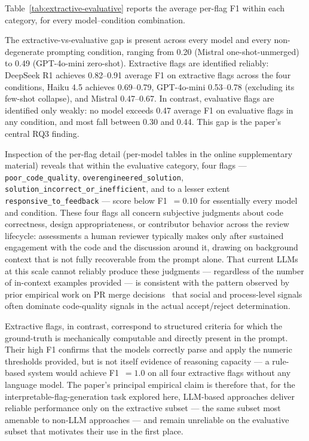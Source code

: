 Table~\ref{tab:extractive-evaluative} reports the average per-flag F1
within each category, for every model--condition combination.


The extractive-vs-evaluative gap is present across every model and
every non-degenerate prompting condition, ranging from 0.20 (Mistral
one-shot-unmerged) to 0.49 (GPT-4o-mini zero-shot).  Extractive flags
are identified reliably: DeepSeek R1 achieves 0.82--0.91 average F1
on extractive flags across the four conditions, Haiku 4.5 achieves
0.69--0.79, GPT-4o-mini 0.53--0.78 (excluding its few-shot collapse),
and Mistral 0.47--0.67.  In contrast, evaluative flags are identified
only weakly: no model exceeds 0.47 average F1 on evaluative flags in
any condition, and most fall between 0.30 and 0.44.  This gap is the
paper's central RQ3 finding.

Inspection of the per-flag detail (per-model tables in the online
supplementary material) reveals that within the evaluative category,
four flags --- \texttt{poor\_code\_quality},
\texttt{overengineered\_solution},
\texttt{solution\_incorrect\_or\_inefficient}, and to a lesser extent
\texttt{responsive\_to\_feedback} --- score below F1~$=0.10$ for
essentially every model and condition.  These four flags all concern
subjective judgments about code correctness, design appropriateness,
or contributor behavior across the review lifecycle: assessments a
human reviewer typically makes only after sustained engagement with
the code and the discussion around it, drawing on background context
that is not fully recoverable from the prompt alone.  That current
LLMs at this scale cannot reliably produce these judgments ---
regardless of the number of in-context examples provided --- is
consistent with the pattern observed by prior empirical work on PR
merge decisions~\cite{zhang2023decisions,lenarduzzi2021codequality} that social and
process-level signals often dominate code-quality signals in the
actual accept/reject determination.

Extractive flags, in contrast, correspond to structured criteria for
which the ground-truth is mechanically computable and directly present
in the prompt.  Their high F1 confirms that the models correctly parse
and apply the numeric thresholds provided, but is not itself evidence
of reasoning capacity --- a rule-based system would achieve F1~$=1.0$
on all four extractive flags without any language model.  The paper's
principal empirical claim is therefore that, for the
interpretable-flag-generation task explored here, LLM-based approaches
deliver reliable performance only on the extractive subset --- the
same subset most amenable to non-LLM approaches --- and remain
unreliable on the evaluative subset that motivates their use in the
first place.

